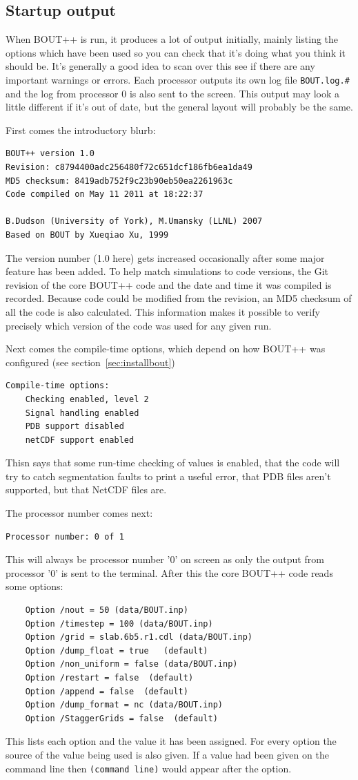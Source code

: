 \documentclass[12pt]{article}
\begin{document}
\subsection{Startup output}

When BOUT++ is run, it produces a lot of output initially, mainly listing
the options which have been used so you can check that it's doing what you
think it should be. It's generally a good idea to scan over this
see if there are any important warnings or errors. Each processor outputs
its own log file \texttt{BOUT.log.\#}
and the log from processor 0 is also sent to the screen. This output may
look a little different if it's out of date, but the general layout will
probably be the same.

First comes the introductory blurb:
\begin{verbatim}
BOUT++ version 1.0
Revision: c8794400adc256480f72c651dcf186fb6ea1da49
MD5 checksum: 8419adb752f9c23b90eb50ea2261963c
Code compiled on May 11 2011 at 18:22:37

B.Dudson (University of York), M.Umansky (LLNL) 2007
Based on BOUT by Xueqiao Xu, 1999
\end{verbatim}
The version number (1.0 here) gets increased occasionally after
some major feature has been added. To help match simulations to code versions,
the Git revision of the core BOUT++ code and the date and time it was
compiled is recorded. Because code could be modified from the revision,
an MD5 checksum of all the code is also calculated. This information
makes it possible to verify precisely which version of the code was used
for any given run.

Next comes the compile-time options, which depend on how
BOUT++ was configured (see section~\ref{sec:installbout})
\begin{verbatim}
Compile-time options:
	Checking enabled, level 2
	Signal handling enabled
	PDB support disabled
	netCDF support enabled
\end{verbatim}
Thisn says that some run-time checking of values is enabled,
that the code will try to catch segmentation faults to print a useful
error, that PDB files aren't supported, but that NetCDF files are.

The processor number comes next:
\begin{verbatim}
Processor number: 0 of 1
\end{verbatim}
This will always be processor number '0' on screen as only the output
from processor '0' is sent to the terminal. After this
the core BOUT++ code reads some options:
\begin{verbatim}
	Option /nout = 50 (data/BOUT.inp)
	Option /timestep = 100 (data/BOUT.inp)
	Option /grid = slab.6b5.r1.cdl (data/BOUT.inp)
	Option /dump_float = true   (default)
	Option /non_uniform = false (data/BOUT.inp)
	Option /restart = false  (default)
	Option /append = false  (default)
	Option /dump_format = nc (data/BOUT.inp)
	Option /StaggerGrids = false  (default)
\end{verbatim}
This lists each option and the value it has been assigned.
For every option the source of the value being used is also given.
If a value had been given on the command line then \texttt{(command line)}
would appear after the option.
\end{document}
